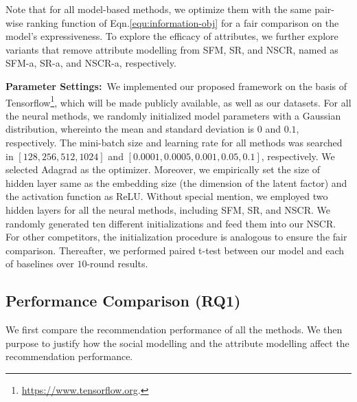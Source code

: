 \documentclass[sigconf]{acmart}
\begin{document}
	\noindent Note that for all model-based methods, we optimize them with the same pair-wise ranking function of Eqn.\eqref{equ:information-obj} for a fair comparison on the model's expressiveness.
	To explore the efficacy of attributes, we further explore variants that remove attribute modelling from SFM, SR, and NSCR, named as SFM-a, SR-a, and NSCR-a, respectively.


	\textbf{Parameter Settings:}~We implemented our proposed framework on the basis of Tensorflow\footnote{\url{https://www.tensorflow.org}.}, which will be made publicly available, as well as our datasets. For all the neural methods, we randomly initialized model parameters with a Gaussian distribution, whereinto the mean and standard deviation is $0$ and $0.1$, respectively. The mini-batch size and learning rate for all methods was searched in $[128,256,512,1024]$ and $[0.0001,0.0005,0.001,0.05,0.1]$, respectively. We selected Adagrad as the optimizer. Moreover, we empirically set the size of hidden layer same as the embedding size (the dimension of the latent factor) and the activation function as ReLU. Without special mention, we employed two hidden layers for all the neural methods, including SFM, SR, and NSCR. We randomly generated ten different initializations and feed them into our NSCR. For other competitors, the initialization procedure is analogous to ensure the fair comparison. Thereafter, we performed paired t-test between our model and each of baselines over $10$-round results.




	








\subsection{Performance Comparison (RQ1)}
We first compare the recommendation performance of all the methods. We then purpose to justify how the social modelling and the attribute modelling affect the recommendation performance.
\end{document}
